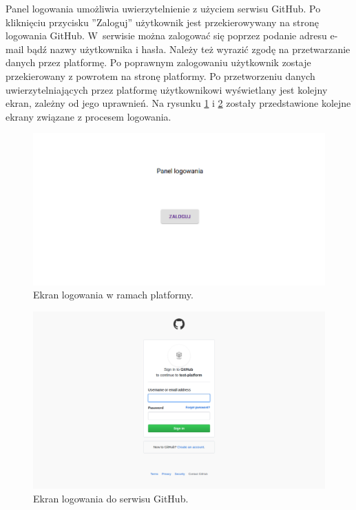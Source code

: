 Panel logowania umożliwia uwierzytelnienie z użyciem serwisu GitHub.
Po kliknięciu przycisku ”Zaloguj” użytkownik jest przekierowywany na stronę logowania GitHub.
W~serwisie można zalogować się poprzez podanie adresu e-mail bądź nazwy użytkownika i hasła.
Należy też wyrazić zgodę na przetwarzanie danych przez platformę.
Po poprawnym zalogowaniu użytkownik zostaje przekierowany z powrotem na stronę platformy.
Po przetworzeniu danych uwierzytelniających przez platformę użytkownikowi wyświetlany jest kolejny ekran, zależny od jego uprawnień.
Na rysunku \ref{fig:log_in_button} i \ref{fig:log_in_github} zostały przedstawione kolejne ekrany związane z procesem logowania.

\begin{figure}[H]
    \centering
    \includegraphics[width = 13cm]{back/log_in_button.png}
    \caption{Ekran logowania w ramach platformy.}
    \label{fig:log_in_button}
\end{figure}

\vfill
\pagebreak

\begin{figure}[H]
    \centering
    \includegraphics[width = 13cm]{back/log_in_github.png}
    \caption{Ekran logowania do serwisu GitHub.}
    \label{fig:log_in_github}
\end{figure}


